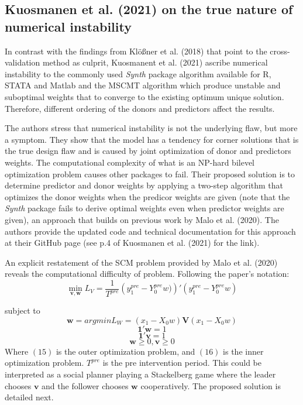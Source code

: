\documentclass[12pt,a4paper,draft]{article}
\begin{document}
\subsection{Kuosmanen et al. (2021) on the true nature of numerical instability}

In contrast with the findings from Klößner et al. (2018) that point to the 
cross-validation method as culprit, Kuosmanent et al. (2021) ascribe numerical 
instability to the commonly used \emph{Synth} package algorithm available for 
R, STATA and Matlab and the MSCMT algorithm which produce unstable and suboptimal 
weights that to converge to the existing optimum unique solution. 
Therefore, different ordering of the donors and predictors affect the results. 

The authors stress that numerical instability is not the underlying flaw, but more 
a symptom. They show that the model has a tendency for corner solutions that 
is the true design flaw and is caused by joint optimization of donor and 
predictors weights. The computational complexity of what is an NP-hard 
bilevel optimization problem causes other packages to fail. 
Their proposed solution is to determine predictor and donor 
weights by applying a two-step algorithm that optimizes the donor 
weights when the predicor weights are given (note that the \emph{Synth} package 
fails to derive optimal weights even when predictor weights are given), 
an approach that builds on previous work by Malo et al. (2020). The
authors provide the updated code and technical documentation for this approach 
at their GitHub page (see p.4 of Kuosmanen et al. (2021) for the link).

An explicit restatement of the SCM problem provided by Malo et al. (2020) 
reveals the computational difficulty of problem. Following the paper's 
notation:
\begin{equation}
    \min_{\mathbf{v,w}} L_V = 
    \frac{1}{T^{pre}} \left(y_1^{pre}-Y_0^{pre}w)\right) ' 
    \left( y_1^{pre}-Y_0^{pre}w \right)
\end{equation}

subject to
\begin{equation}
    \mathbf{w}= argmin L_W = \left( x_1-X_0 w \right) \mathbf{V}
    \left( x_1 - X_0 w\right)
\end{equation}
$$\mathbf{1'w}=1$$
$$\mathbf{1'v}=1$$
$$\mathbf{w}\ge 0, \mathbf{v} \ge 0$$
Where $(15)$ is the outer optimization problem, and $(16)$ is the inner 
optimization problem. $T^{pre}$ is the pre intervention period. This could be 
interpreted as a social planner playing a Stackelberg game where the 
leader chooses $\mathbf{v}$ and the follower chooses $\mathbf{w}$ cooperatively.
\newline
The proposed solution is detailed next.
\end{document}
